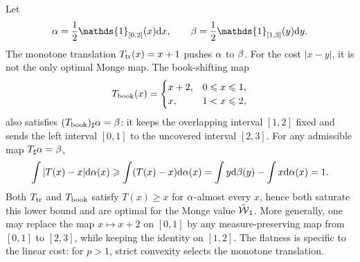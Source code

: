 \begin{example}\label{ex-monge-book-shifting-w1}
	Let
	\[
		\al=\frac12\mathds{1}_{[0,2]}(x)\d x,
		\qquad
		\be=\frac12\mathds{1}_{[1,3]}(y)\d y.
	\]
	The monotone translation $T_{\rm tr}(x)=x+1$ pushes $\al$ to $\be$. For the cost $|x-y|$, it is not the only optimal Monge map. The book-shifting map
	\[
		T_{\rm book}(x)=
		\begin{cases}
			x+2, & 0\leq x\leq1,\\
			x, & 1<x\leq2,
		\end{cases}
	\]
	also satisfies $(T_{\rm book})_\sharp\al=\be$: it keeps the overlapping interval $[1,2]$ fixed and sends the left interval $[0,1]$ to the uncovered interval $[2,3]$. For any admissible map $T_\sharp\al=\be$,
	\[
		\int |T(x)-x|\d\al(x)
		\geq
		\int (T(x)-x)\d\al(x)
		=
		\int y\d\be(y)-\int x\d\al(x)
		=1.
	\]
	Both $T_{\rm tr}$ and $T_{\rm book}$ satisfy $T(x)\geq x$ for $\al$-almost every $x$, hence both saturate this lower bound and are optimal for the Monge value $\tilde\Wass_1$. More generally, one may replace the map $x\mapsto x+2$ on $[0,1]$ by any measure-preserving map from $[0,1]$ to $[2,3]$, while keeping the identity on $[1,2]$. The flatness is specific to the linear cost: for $p>1$, strict convexity selects the monotone translation.
\end{example}

